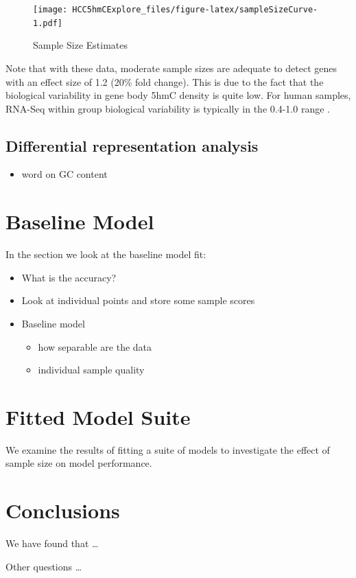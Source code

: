 \documentclass[
]{book}
\providecommand{\tightlist}{%
  \setlength{\itemsep}{0pt}\setlength{\parskip}{0pt}}
\begin{document}
\begin{figure}
\centering
\texttt{[image: HCC5hmCExplore\_files/figure-latex/sampleSizeCurve-1.pdf]}
\caption{\label{fig:sampleSizeCurve}Sample Size Estimates}
\end{figure}

Note that with these data, moderate sample sizes are adequate
to detect genes with an effect size of 1.2 (20\% fold change). This is due to the fact
that the biological variability in gene body 5hmC density is quite low.
For human samples, RNA-Seq within group biological variability is
typically in the 0.4-1.0 range \citep{Hart:2013aa}.

\hypertarget{dra}{%
\section{Differential representation analysis}\label{dra}}

\begin{itemize}
\tightlist
\item
  word on GC content
\end{itemize}

\hypertarget{baseline-model}{%
\chapter{Baseline Model}\label{baseline-model}}

In the section we look at the baseline model fit:

\begin{itemize}
\item
  What is the accuracy?\\
\item
  Look at individual points and store some sample scores
\item
  Baseline model

  \begin{itemize}
  \tightlist
  \item
    how separable are the data
  \item
    individual sample quality
  \end{itemize}
\end{itemize}

\hypertarget{model-suite}{%
\chapter{Fitted Model Suite}\label{model-suite}}

We examine the results of fitting a suite of models to
investigate the effect of sample size on model performance.

\hypertarget{conclusions}{%
\chapter{Conclusions}\label{conclusions}}

We have found that \ldots{}

Other questions \ldots{}

  
\end{document}
